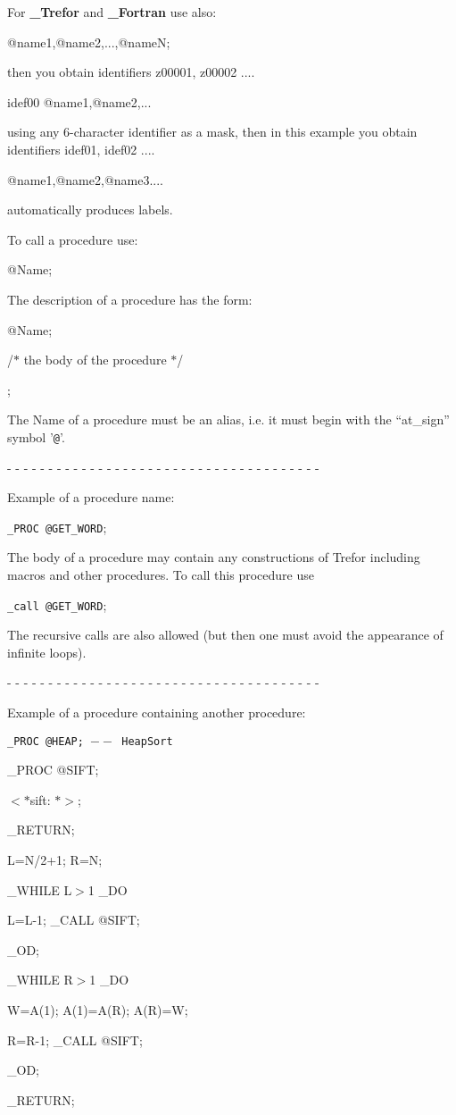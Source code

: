 For {\bf \_Trefor} and {\bf \_Fortran} use also:

 @name1,@name2,...,@nameN;

\par\noindent then you obtain identifiers z00001, z00002 ....

 idef00 @name1,@name2,...

\par\noindent using any 6-character identifier as a mask,
       then in this example you obtain identifiers idef01, idef02 ....

 @name1,@name2,@name3....

\par\noindent automatically produces labels.


\vskip 1.5cm

   To call a procedure use:

 @Name;
\smallskip


 The description of a procedure has the form:

 @Name;

\qquad \quad /$*$ the body of the procedure $*$/

;

The Name of a procedure must be an alias, i.e. it must begin with
the ``at\_sign'' symbol '{\tt @}'.

- - - - - - - - - - - - - - - - - - - - - - - - - - - - - - - - - - - - - -

       Example of a procedure name:

         {\tt \_PROC @GET\_WORD};

The body of a procedure may contain any constructions of Trefor
including macros  and other procedures. To call this procedure use

         {\tt \_call @GET\_WORD};

The recursive calls are also allowed (but then one must avoid
the appearance of infinite loops).

- - - - - - - - - - - - - - - - - - - - - - - - - - - - - - - - - - - - - -

       Example of a procedure containing another procedure:


{\tt       \_PROC @HEAP;   $--$ HeapSort

           \_PROC @SIFT;

             $<*$sift: $*>$;

           \_RETURN;

           L=N/2+1; R=N;

           \_WHILE L$>$1 \_DO

              L=L-1; \_CALL @SIFT;

           \_OD;

           \_WHILE R$>$1 \_DO

              W=A(1); A(1)=A(R); A(R)=W;

              R=R-1; \_CALL @SIFT;

           \_OD;

         \_RETURN; }

